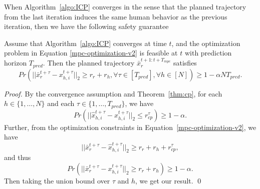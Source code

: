 When Algorithm~\ref{algo:ICP} converges in the sense that the planned trajectory
from the last iteration induces the same human behavior as 
the previous iteration, then we have the following safety guarantee
\begin{theorem}
    Assume that Algorithm~\ref{algo:ICP} converges at time $t$,
    and the optimization problem in Equation \ref{mpc-optimization-v2} is feasible
    at $t$ with prediction horizon $T_{pred}$. Then the planned trajectory $\bar{x}_r^{t+1:t+T_{mpc}}$ satisfies
    \[
        Pr \left(
            ||\bar{x}_r^{t+\tau} - x_{h, i}^{t+\tau}||_2
            \geq r_r + r_h,
            \forall
            \tau \in
            [T_{pred}],
            \forall
            h \in
            [N]
        \right)
        \ge
        1 - \alpha N T_{pred}.
    \]
\end{theorem}
\begin{proof}
    By the convergence assumption and Theorem~\ref{thm:cp}, 
    for each $h \in \{1, \dots, N\}$ and each 
    $\tau \in \{1, \dots, T_{pred}\}$,
    we have
    \[
        Pr \left(
            ||\hat{x}_{h, i}^{t+\tau} - x_{h, i}^{t+\tau}||_2
            \le r^{\tau}_{cp}
        \right)
        \ge
        1 - \alpha.
    \]
    Further, from the optimization constraints in Equation~\ref{mpc-optimization-v2}, we have
    \[
        ||\bar{x}_r^{t+\tau} - \hat{x}_{h, i}^{t+\tau}||_2
        \geq r_r + r_h + r^{\tau}_{cp},
    \]
    and thus
    \[
        Pr \left(
            ||\bar{x}_r^{t+\tau} - x_{h, i}^{t+\tau}||_2
            \geq r_r + r_h
        \right)
        \ge
        1 - \alpha.
    \]
    Then taking the union bound over $\tau$ and $h$, we get our result.
    \qed
\end{proof}